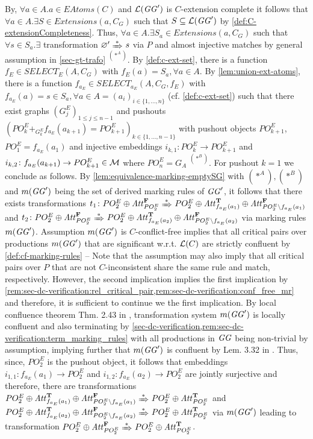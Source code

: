 By, $\forall a \in A.a \in EAtoms(C)$ and $\mathcal{L}(\mathit{GG}')$ is $C$-extension complete it follows that $\forall a \in A.\exists S \in Extensions(a,C_G)$ such that $S \subseteq \mathcal{L}(\mathit{GG}')$ by \cref{def:C-extensionCompleteness}.
Thus, $\forall a \in A.\exists S_a \in Extensions(a,C_G)$ such that $\forall s \in S_a.\exists$ transformation $\varnothing' \Trans{*} s$ via $P$ and almost injective matches by general assumption in \cref{sec-gt-trafo} $^{(*^A)}$.
By \cref{def:c-ext-set}, there is a function $f_E \in SELECT_E(A,C_G)$ with $f_E(a)=S_a,\forall a \in A$.
By \cref{lem:union-ext-atoms}, there is a function $f_{a_E} \in SELECT_{a_E}(A,C_G,f_E)$ with $f_{a_E}(a)=s \in S_a,\forall a \in A=(a_i)_{i \in \{1,\ldots,n\}}$ (cf. \cref{def:c-ext-set}) such that there exist graphs $(G^E_j)_{1 \leq j \leq n-1}$ and pushouts $(PO^E_k +_{G^E_k} f_{a_E}(a_{k+1})=PO^E_{k+1})_{k \in \{1,\ldots,n-1\}}$ with pushout objects $PO^E_{k+1}$, $PO^E_1=f_{a_E}(a_1)$ and injective embeddings $i_{k,1}\colon PO^E_k \to PO^E_{k+1}$ and $i_{k,2}\colon f_{a_E}(a_{k+1}) \to PO^E_{k+1} \in {\cal M}$ where $PO^E_n=G_A$ $^{(*^B)}$.
For pushout $k=1$ we conclude as follows.
By \cref{lem:equivalence-marking-emptySG} with $(*^A),(*^B)$ and $m(\mathit{GG}')$ being the set of derived marking rules of $\mathit{GG}'$, it follows that there exists transformations $t_1\colon PO^E_2 \oplus \Att^\False_{PO^E_2} \Trans{*} PO^E_2 \oplus \Att^\True_{f_{a_E}(a_1)} \oplus \Att^\False_{PO^E_2 \setminus f_{a_E}(a_1)}$ and $t_2\colon PO^E_2 \oplus \Att^\False_{PO^E_2} \Trans{*} PO^E_2 \oplus \Att^\True_{f_{a_E}(a_2)} \oplus \Att^\False_{PO^E_2 \setminus f_{a_E}(a_2)}$ via marking rules $m(\mathit{GG}')$.
Assumption $m(\mathit{GG}')$ is $C$-conflict-free implies that all critical pairs over productions $m(\mathit{GG}')$ that are significant w.r.t. $\mathcal{L}(C)$ are strictly confluent by \cref{def:cf-marking-rules} -- Note that the assumption may also imply that all critical pairs over $P$ that are not $C$-inconsistent share the same rule and match, respectively.
However, the second implication implies the first implication by \cref{rem:sec-dc-verification:rel_critical_pair,rem:sec-dc-verification:conf_free_mr} and therefore, it is sufficient to continue we the first implication.
By local confluence theorem Thm. 2.43 in \cite{FAGT2}, transformation system $m(\mathit{GG}')$ is locally confluent and also terminating by \cref{sec-dc-verification,rem:sec-dc-verification:term_marking_rules} with all productions in $\mathit{GG}$ being non-trivial by assumption, implying further that $m(\mathit{GG}')$ is confluent by Lem. 3.32 in \cite{Ehrig:2006:FAG:1121741}.
Thus, since, $PO^E_2$ is the pushout object, it follows that embeddings $i_{1,1}\colon f_{a_E}(a_1) \to PO^E_2$ and $i_{1,2}\colon f_{a_E}(a_2) \to PO^E_2$ are jointly surjective and therefore, there are transformations $PO^E_2 \oplus \Att^\True_{f_{a_E}(a_1)} \oplus \Att^\False_{PO^E_2 \setminus f_{a_E}(a_1)} \Trans{*} PO^E_2 \oplus \Att^\True_{PO^E_2}$ and $PO^E_2 \oplus \Att^\True_{f_{a_E}(a_2)} \oplus \Att^\False_{PO^E_2 \setminus f_{a_E}(a_2)} \Trans{*} PO^E_2 \oplus \Att^\True_{PO^E_2}$ via $m(\mathit{GG}')$ leading to transformation $PO^E_2 \oplus \Att^\False_{PO^E_2} \Trans{*} PO^E_2 \oplus \Att^\True_{PO^E_2}$.
